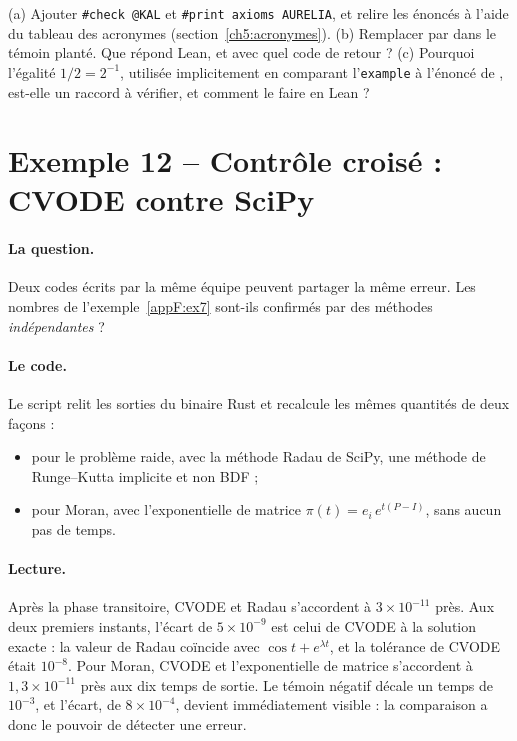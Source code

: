 \begin{exercise}\label{appF:exo11}
(a) Ajouter \texttt{\#check @KAL} et \texttt{\#print axioms AURELIA}, et relire les énoncés à l'aide du tableau des
acronymes (section~\ref{ch5:acronymes}). (b) Remplacer  par  dans le témoin
planté. Que répond Lean, et avec quel code de retour ? (c) Pourquoi l'égalité $1/2=2^{-1}$, utilisée implicitement en
comparant l'\texttt{example} à l'énoncé de , est-elle un raccord à vérifier, et comment le faire en Lean ?
\end{exercise}

\section{Exemple 12 -- Contrôle croisé : CVODE contre SciPy}\label{appF:ex12}

\paragraph{La question.} Deux codes écrits par la même équipe peuvent partager la même erreur. Les nombres de
l'exemple~\ref{appF:ex7} sont-ils confirmés par des méthodes \emph{indépendantes} ?

\paragraph{Le code.} Le script relit les sorties du binaire Rust et recalcule les mêmes quantités de deux façons :
\begin{itemize}
\item pour le problème raide, avec la méthode Radau de SciPy, une méthode de Runge--Kutta implicite et non BDF ;
\item pour Moran, avec l'exponentielle de matrice $\pi(t)=e_i\,e^{t(P-I)}$, sans aucun pas de temps.
\end{itemize}


\paragraph{Lecture.} Après la phase transitoire, CVODE et Radau s'accordent à $3\times10^{-11}$ près. Aux deux premiers
instants, l'écart de $5\times10^{-9}$ est celui de CVODE à la solution exacte : la valeur de Radau coïncide avec
$\cos t+e^{\lambda t}$, et la tolérance de CVODE était $10^{-8}$. Pour Moran, CVODE et l'exponentielle de matrice
s'accordent à $1{,}3\times10^{-11}$ près aux dix temps de sortie. Le témoin négatif décale un temps de $10^{-3}$, et
l'écart, de $8\times10^{-4}$, devient immédiatement visible : la comparaison a donc le pouvoir de détecter une erreur.

